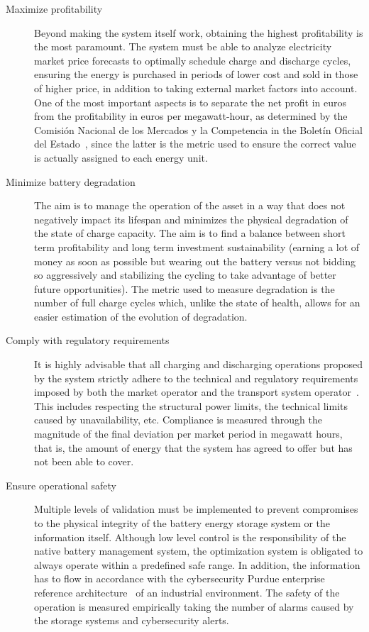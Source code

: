 \begin{description}

  \item[Maximize profitability] Beyond making the system itself work, obtaining the highest profitability is the most paramount. The system must be able to analyze electricity market price forecasts to optimally schedule charge and discharge cycles, ensuring the energy is purchased in periods of lower cost and sold in those of higher price, in addition to taking external market factors into account. One of the most important aspects is to separate the net profit in euros from the profitability in euros per megawatt-hour, as determined by the Comisión Nacional de los Mercados y la Competencia in the Boletín Oficial del Estado~\cite{cnmc2025resolucion}, since the latter is the metric used to ensure the correct value is actually assigned to each energy unit.

  \item[Minimize battery degradation] The aim is to manage the operation of the asset in a way that does not negatively impact its lifespan and minimizes the physical degradation of the state of charge capacity. The aim is to find a balance between short term profitability and long term investment sustainability (earning a lot of money as soon as possible but wearing out the battery versus not bidding so aggressively and stabilizing the cycling to take advantage of better future opportunities). The metric used to measure degradation is the number of full charge cycles which, unlike the state of health, allows for an easier estimation of the evolution of degradation.

  \item[Comply with regulatory requirements] It is highly advisable that all charging and discharging operations proposed by the system strictly adhere to the technical and regulatory requirements imposed by both the market operator and the transport system operator~\cite{crespo2004resolucion}. This includes respecting the structural power limits, the technical limits caused by unavailability, etc. Compliance is measured through the magnitude of the final deviation per market period in megawatt hours, that is, the amount of energy that the system has agreed to offer but has not been able to cover.

  \item[Ensure operational safety] Multiple levels of validation must be implemented to prevent compromises to the physical integrity of the battery energy storage system or the information itself. Although low level control is the responsibility of the native battery management system, the optimization system is obligated to always operate within a predefined safe range. In addition, the information has to flow in accordance with the cybersecurity Purdue enterprise reference architecture~\cite{williams1994purdue} of an industrial environment. The safety of the operation is measured empirically taking the number of alarms caused by the storage systems and cybersecurity alerts.


\end{description}
